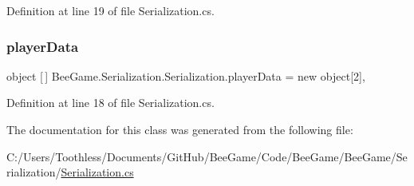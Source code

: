 Definition at line 19 of file Serialization.\+cs.

\mbox{\label{class_bee_game_1_1_serialization_1_1_serialization_a4c53353a34466434389b58c351edf08d}} 
\subsubsection{\texorpdfstring{player\+Data}{playerData}}
{\footnotesize\ttfamily object \mbox{[}$\,$\mbox{]} Bee\+Game.\+Serialization.\+Serialization.\+player\+Data = new object\mbox{[}2\mbox{]}\hspace{0.3cm}{\ttfamily [static]}, {\ttfamily [private]}}



Definition at line 18 of file Serialization.\+cs.



The documentation for this class was generated from the following file\+:\begin{DoxyCompactItemize}
\item 
C\+:/\+Users/\+Toothless/\+Documents/\+Git\+Hub/\+Bee\+Game/\+Code/\+Bee\+Game/\+Bee\+Game/\+Serialization/\hyperlink{_serialization_8cs}{Serialization.\+cs}\end{DoxyCompactItemize}
